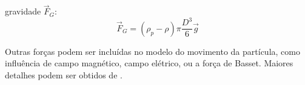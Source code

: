 gravidade $\vec{F}_G$:
\begin{equation}
	\vec{F}_G = (\rho_p-\rho)\pi\frac{D^3}{6}\vec{g}
\end{equation}

Outras forças podem ser incluídas no modelo do movimento da partícula,
como influência de campo magnético, campo elétrico, ou a força de
Basset. Maiores detalhes podem ser obtidos de \citet{crowe2012}.

%
%
%
%
%
%
%
%
%












